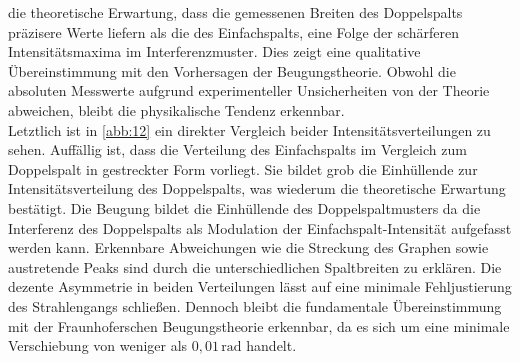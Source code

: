 die theoretische Erwartung, dass die gemessenen Breiten des Doppelspalts präzisere
Werte liefern als die des Einfachspalts, eine Folge der schärferen 
Intensitätsmaxima im Interferenzmuster. Dies zeigt eine qualitative
Übereinstimmung mit den Vorhersagen der Beugungstheorie. Obwohl die absoluten 
Messwerte aufgrund experimenteller Unsicherheiten von der Theorie abweichen,
bleibt die physikalische Tendenz erkennbar.
\\
\noindent Letztlich ist in \autoref{abb:12} ein direkter Vergleich beider 
Intensitätsverteilungen zu sehen. Auffällig ist, dass die Verteilung des 
Einfachspalts im Vergleich zum Doppelspalt in gestreckter Form vorliegt. Sie 
bildet grob die Einhüllende zur Intensitätsverteilung des Doppelspalts, 
was wiederum die theoretische Erwartung bestätigt. Die Beugung bildet die 
Einhüllende des Doppelspaltmusters da die Interferenz des Doppelspalts als 
Modulation der Einfachspalt-Intensität aufgefasst werden kann. Erkennbare 
Abweichungen wie die Streckung des Graphen sowie austretende Peaks sind durch 
die unterschiedlichen Spaltbreiten zu erklären. Die dezente Asymmetrie in beiden
Verteilungen lässt auf eine minimale Fehljustierung des Strahlengangs schließen.
Dennoch bleibt die fundamentale Übereinstimmung mit der Fraunhoferschen
Beugungstheorie erkennbar, da es sich um eine minimale Verschiebung von weniger 
als $0,01\,\text{rad}$ handelt.